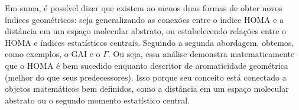 Em suma, é possível dizer que existem ao menos duas formas de obter novos índices geométricos: seja generalizando as conexões entre o índice \gls{HOMA} e a distância em um espaço molecular abstrato, ou estabelecendo relações entre o \gls{HOMA} e índices estatísticos centrais. Seguindo a segunda abordagem, obtemos, como exemplos, o \gls{GAI} e o $\Gamma$. Ou seja, essa análise demonstra matematicamente que o \gls{HOMA} é bem sucedido enquanto descritor de aromaticidade geométrica (melhor do que seus predecessores). Isso porque seu conceito está conectado a objetos matemáticos bem definidos, como a distância em um espaço molecular abstrato ou o segundo momento estatístico central.